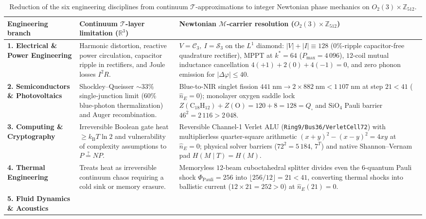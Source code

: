 \documentclass[11pt,a4paper]{article}
\theoremstyle{definition}
\theoremstyle{remark}
\begin{document}
\begin{table}[htbp]
\centering
\caption{Reduction of the six engineering disciplines from continuum $\mathcal{T}$-approximations to integer Newtonian phase mechanics on $O_2(3)\times\mathbb{Z}_{512}$.}
\label{tab:engineering-homeomorphism}
\footnotesize
\begin{tabular}{@{}p{}p{}p{}@{}}
\toprule
\textbf{Engineering branch} & \textbf{Continuum $\mathcal{T}$-layer limitation ($\mathbb{R}^3$)} & \textbf{Newtonian $\mathcal{M}$-carrier resolution ($O_2(3)\times\mathbb{Z}_{512}$)} \\
\midrule
\textbf{1. Electrical \& Power Engineering} &
Harmonic distortion, reactive power circulation, capacitor ripple in rectifiers, and Joule losses $I^2 R$. &
$V=\mathcal{C}_3,\ I=\mathcal{S}_3$ on the $L^1$ diamond: $|V|+|I|\equiv 128$ ($0\%$-ripple capacitor-free quadrature rectifier), MPPT at $k^*=64$ ($P_{\max}=4\,096$), $12$-coil mutual inductance cancellation $4(+1)+2(0)+4(-1)=0$, and zero phonon emission for $|\Delta\varphi|\le 40$. \\
\addlinespace[3pt]
\textbf{2. Semiconductors \& Photovoltaics} &
Shockley--Queisser $\sim 33\%$ single-junction limit ($60\%$ blue-photon thermalization) and Auger recombination. &
Blue-to-NIR singlet fission $441\;\text{nm}\to 2\times 882\;\text{nm} < 1\,107\;\text{nm}$ at step $21 < 41$ ($\hat{n}_E=0$); monolayer oxygen saddle lock $Z(\mathrm{C_{18}H_{12}})+Z(\mathrm{O})=120+8=128=Q_\square$ and $\mathrm{SiO}_4$ Pauli barrier $46^2=2\,116>2\,048$. \\
\addlinespace[3pt]
\textbf{3. Computing \& Cryptography} &
Irreversible Boolean gate heat $\ge k_{\mathrm{B}}T\ln 2$ and vulnerability of complexity assumptions to $P\stackrel{?}{=}NP$. &
Reversible Channel-1 Verlet ALU (\texttt{Ring9/Bus36/VerletCell72}) with multiplierless quarter-square arithmetic $(x+y)^2-(x-y)^2=4xy$ at $\hat{n}_E=0$; physical solver barriers ($72^2=5\,184$, $7^T$) and native Shannon--Vernam pad $H(M\mid T)=H(M)$. \\
\addlinespace[3pt]
\textbf{4. Thermal Engineering} &
Treats heat as irreversible continuum chaos requiring a cold sink or memory erasure. &
Memoryless $12$-beam cuboctahedral splitter divides even the $6$-quantum Pauli shock $\Phi_{\mathrm{Pauli}}=256$ into $\lfloor 256/12\rfloor = 21 < 41$, converting thermal shocks into ballistic current ($12\times 21=252>0$) at $\hat{n}_E(21)=0$. \\
\addlinespace[3pt]
\textbf{5. Fluid Dynamics \& Acoustics} &

\end{tabular}
\end{table}
\end{document}
